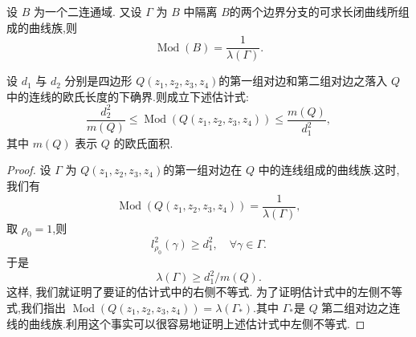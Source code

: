 \begin{thm}
    设 $B$ 为一个二连通域. 又设 $\Gamma$ 为 $B$ 中隔离 $B$的两个边界分支的可求长闭曲线所组成的曲线族,则
    \[\operatorname{Mod}(B)=\frac{1}{\lambda(\Gamma)}.\]
\end{thm}

\begin{thm}[Rengel不等式]\label{thm: rengel inequality}
    设 $d_1$ 与 $d_2$ 分别是四边形 $Q(z_1,z_2,z_3,z_4)$的第一组对边和第二组对边之落入 $Q$ 中的连线的欧氏长度的下确界.则成立下述估计式:
    \[\frac{d_2^2}{m(Q)}\leqslant \operatorname{Mod}(Q(z_1,z_2,z_3,z_4))\leqslant \frac{m(Q)}{d_1^2},\]
    其中 $m(Q)$ 表示 $Q$ 的欧氏面积.
\end{thm}
\begin{proof}
    设 $\Gamma$ 为 $Q(z_1,z_2,z_3,z_4)$的第一组对边在 $Q$ 中的连线组成的曲线族.这时, 我们有
    \[\operatorname{Mod}(Q(z_1,z_2,z_3,z_4))=\frac{1}{\lambda(\Gamma)},\]
    取 $\rho_0=1$,则
    \[l_{\rho_0}^2 (\gamma)\geqslant d_1^2,\quad\forall \gamma\in \Gamma.\]
    于是
    \[\lambda(\Gamma)\geqslant d_1^2/m(Q).\]
    这样, 我们就证明了要证的估计式中的右侧不等式.
    为了证明估计式中的左侧不等式,我们指出 $\operatorname{Mod}(Q(z_1,z_2,z_3,z_4))=\lambda(\Gamma_*)$.其中 $\Gamma_*$是 $Q$ 第二组对边之连线的曲线族.利用这个事实可以很容易地证明上述估计式中左侧不等式.
\end{proof}

